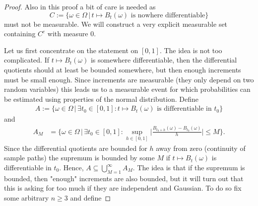 \begin{proof}[Proof]
	Also in this proof a bit of care is needed as $$C:=\{\omega\in \Omega\,|\, t\mapsto B_t(\omega)\text{ is nowhere differentiable}\}$$ must not be measurable. We will construct a very explicit measurable set containing $C^c$ with measure $0$.\smallskip

	Let us first concentrate on the statement on $[0,1]$. The idea is not too complicated. If $t\mapsto B_t(\omega)$ is somewhere differentiable, then the differential quotients should at least be bounded somewhere, but then enough increments must be small enough. Since increments are measurable (they only depend on two random variables) this leads us to a measurable event for which probabilities can be estimated using properties of the normal distribution.
	Define 
	\begin{align*}
		A:=\Big\{\omega \in \Omega\,\Big|\, \exists t_0 \in [0,1]: t\mapsto B_t(\omega)\text{ is differentiable in }t_0\Big\}
	\end{align*}
and
	\begin{align*}
		A_M &= \Big\{ \omega\in\Omega \,\Big|\, \exists t_0 \in [0,1] \colon \sup_{h \in [0,1]} \Big\vert \frac{B_{t_0+h}(\omega)-B_{t_0}(\omega)}{h}\Big\vert \leq M\Big\}.
	\end{align*}
	Since the differential quotients are bounded for $h$ away from zero (continuity of sample paths) the supremum is bounded by some $M$ if $t\mapsto B_t(\omega)$ is differentiable in $t_0$. Hence, $A \subseteq \bigcup_{M=1}^{\infty} A_M$. The idea is that if the supremum is bounded, then "{}enough"{} increments are also bounded, but it will turn out that this is asking for too much if they are independent and Gaussian. To do so fix some arbitrary $n\geq 3$ and define

\end{proof}
